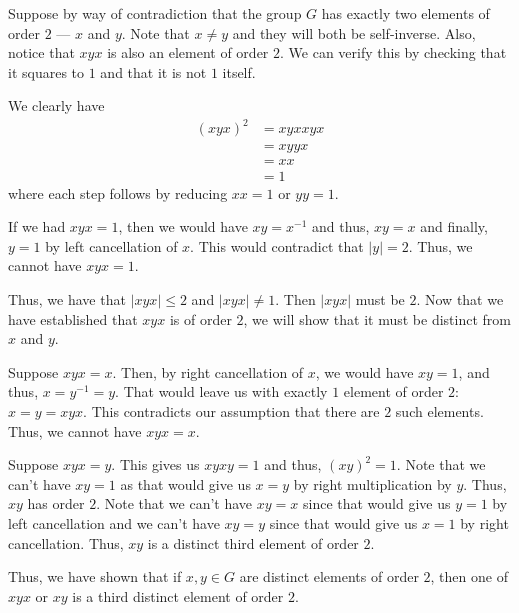 \documentclass[12 pt, letterpaper]{hmcpset}
\begin{document}
\begin{solution}
	Suppose by way of contradiction that the group $G$  has exactly two elements of order $2$ ---  $x$  and $y$. Note that $x \neq y$ and they will both be self-inverse. Also, notice that $xyx$ is also an element of order $2$. We can verify this by checking that it squares to $1$ and that it is not $1$ itself.

	We clearly have
	\[
		\begin{split}
			(xyx)^{2} & = xyxxyx \\
				  & = xyyx \\
				  & = xx \\
				  & = 1
		\end{split}
	\]
	where each step follows by reducing $xx = 1$ or $yy = 1$. 

	If we had $xyx = 1$, then we would have $xy = x^{-1}$ and thus, $xy = x$ and finally, $y = 1$ by left cancellation of $x$. This would contradict that $\vert y \vert = 2$. Thus, we cannot have $xyx = 1$. 

	Thus, we have that $\vert xyx \vert \le 2$ and $\vert xyx \vert \neq 1$. Then $\vert xyx \vert$ must be $2$. Now that we have established that $xyx$ is of order $2$, we will show that it must be distinct from $x$ and $y$. 

	Suppose $xyx = x$. Then, by right cancellation of $x$, we would have $xy = 1$, and thus, $x = y^{-1} = y$. That would leave us with exactly $1$ element of order $2$: $x = y = xyx$. This contradicts our assumption that there are $2$ such elements. Thus, we cannot have $xyx = x$. 

	Suppose $xyx = y$. This gives us $xyxy = 1$ and thus, $(xy)^{2} = 1$. Note that we can't have $xy = 1$ as that would give us $x = y$ by right multiplication by $y$. Thus, $xy$ has order $2$. Note that we can't have $xy = x$ since that would give us $y = 1$ by left cancellation and we can't have $xy = y$ since that would give us $x = 1$ by right cancellation. Thus, $xy$ is a distinct third element of order $2$. 

	Thus, we have shown that if $x, y \in G$ are distinct elements of order $2$, then one of $xyx$ or $xy$ is a third distinct element of order $2$.
\end{solution}

\pagebreak
\end{document}
